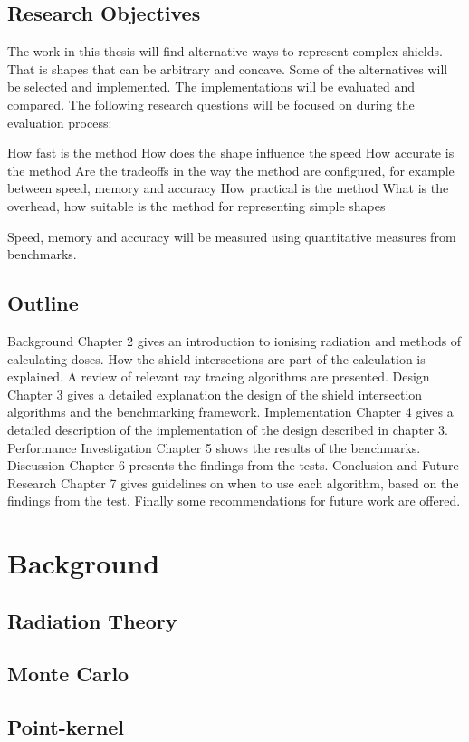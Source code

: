\documentclass[11pt,twoside,a4paper]{report}
\begin{document}
\section{Research Objectives}
The work in this thesis will find alternative ways to represent complex shields. That is shapes that can be arbitrary and concave. Some of the alternatives will be selected and implemented. The implementations will be evaluated and compared. The following research questions will be focused on during the evaluation process:

How fast is the method
How does the shape influence the speed
How accurate is the method
Are the tradeoffs in the way the method are configured, for example between speed, memory and accuracy
How practical is the method
What is the overhead, how suitable is the method for representing simple shapes

Speed, memory and accuracy will be measured using quantitative measures from benchmarks. 

\section{Outline}
Background
Chapter 2 gives an introduction to ionising radiation and methods of calculating doses. How the shield intersections are part of the calculation is explained.  A review of relevant ray tracing algorithms are presented. 
Design
Chapter 3 gives a detailed explanation the design of the shield intersection algorithms and the benchmarking framework. 
Implementation
Chapter 4 gives a detailed description of the implementation of the design described in chapter 3.
Performance Investigation
Chapter 5 shows the results of the benchmarks.
Discussion
Chapter 6 presents the findings from the tests.
Conclusion and Future Research
Chapter 7 gives guidelines on when to use each algorithm, based on the findings from the test. Finally some recommendations for future work are offered.


\chapter{Background}
\section{Radiation Theory}
\section{Monte Carlo}
\section{Point-kernel}
\end{document}
